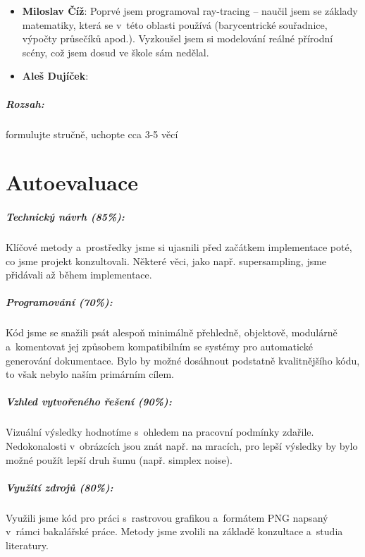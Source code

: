 \documentclass[12pt,a4paper,titlepage,final]{report}
\newcommand\AuthorA{Miloslav Číž}
\newcommand\AuthorB{Aleš Dujíček}
\begin{document}
\begin{itemize}
\item \textbf{\AuthorA}: Poprvé jsem programoval ray-tracing -- naučil
jsem se základy matematiky, která se v~této oblasti
používá (barycentrické souřadnice, výpočty průsečíků apod.). Vyzkoušel
jsem si modelování reálné přírodní scény, což jsem dosud ve škole sám
nedělal.
\item \textbf{\AuthorB}:
\end{itemize}

\paragraph{Rozsah:} formulujte stručně, uchopte cca 3-5 věcí

\chapter{Autoevaluace}

\paragraph{Technický návrh (85\%):}
Klíčové metody a~prostředky jsme si ujasnili před začátkem implementace
poté, co jsme projekt konzultovali. Některé věci, jako např.
supersampling, jsme přidávali až během implementace.

\paragraph{Programování (70\%):}
Kód jsme se snažili psát alespoň minimálně přehledně, objektově,
modulárně a~komentovat jej způsobem kompatibilním se systémy
pro automatické generování dokumentace. Bylo by možné
dosáhnout podstatně kvalitnějšího kódu, to však nebylo naším primárním
cílem.

\paragraph{Vzhled vytvořeného řešení (90\%):}
Vizuální výsledky hodnotíme s~ohledem na pracovní podmínky zdařile.
Nedokonalosti v~obrázcích jsou znát např. na mracích, pro lepší výsledky
by bylo možné použít lepší druh šumu (např. simplex noise).

\paragraph{Využití zdrojů (80\%):}
Využili jsme kód pro práci s~rastrovou grafikou a~formátem PNG napsaný v~rámci
bakalářské práce. Metody jsme zvolili na základě konzultace a~studia
literatury.
\end{document}
